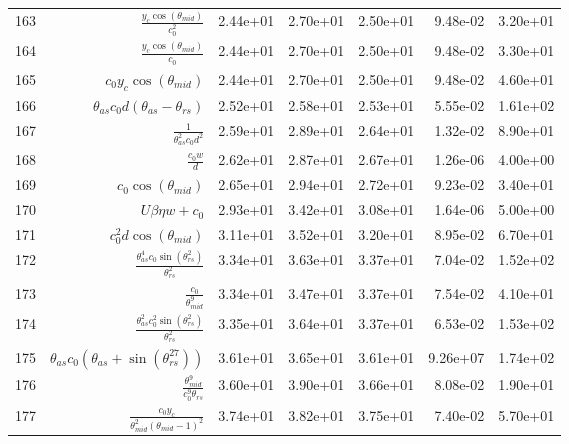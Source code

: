 \begin{tabularx}{\textwidth}{lRRRRRl}
163  &  $ \displaystyle\frac{y_c \cos{\left(\theta_{mid} \right)}}{c_{0}^{2}} $  &  2.44e+01  &  2.70e+01  &  2.50e+01  &  9.48e-02  &  3.20e+01  \\ 
164  &  $ \displaystyle\frac{y_c \cos{\left(\theta_{mid} \right)}}{c_{0}} $  &  2.44e+01  &  2.70e+01  &  2.50e+01  &  9.48e-02  &  3.30e+01  \\ 
165  &  $ c_{0} y_c \cos{\left(\theta_{mid} \right)} $  &  2.44e+01  &  2.70e+01  &  2.50e+01  &  9.48e-02  &  4.60e+01  \\ 
166  &  $ \theta_{as} c_{0} d \left(\theta_{as} - \theta_{rs}\right) $  &  2.52e+01  &  2.58e+01  &  2.53e+01  &  5.55e-02  &  1.61e+02  \\ 
167  &  $ \displaystyle\frac{1}{\theta_{as}^{2} c_{0} d^{2}} $  &  2.59e+01  &  2.89e+01  &  2.64e+01  &  1.32e-02  &  8.90e+01  \\ 
168  &  $ \displaystyle\frac{c_{0} w}{d} $  &  2.62e+01  &  2.87e+01  &  2.67e+01  &  1.26e-06  &  4.00e+00  \\ 
169  &  $ c_{0} \cos{\left(\theta_{mid} \right)} $  &  2.65e+01  &  2.94e+01  &  2.72e+01  &  9.23e-02  &  3.40e+01  \\ 
170  &  $ U \beta \eta w + c_{0} $  &  2.93e+01  &  3.42e+01  &  3.08e+01  &  1.64e-06  &  5.00e+00  \\ 
171  &  $ c_{0}^{2} d \cos{\left(\theta_{mid} \right)} $  &  3.11e+01  &  3.52e+01  &  3.20e+01  &  8.95e-02  &  6.70e+01  \\ 
172  &  $ \displaystyle\frac{\theta_{as}^{4} c_{0} \sin{\left(\theta_{rs}^{2} \right)}}{\theta_{rs}^{2}} $  &  3.34e+01  &  3.63e+01  &  3.37e+01  &  7.04e-02  &  1.52e+02  \\ 
173  &  $ \displaystyle\frac{c_{0}}{\theta_{mid}^{9}} $  &  3.34e+01  &  3.47e+01  &  3.37e+01  &  7.54e-02  &  4.10e+01  \\ 
174  &  $ \displaystyle\frac{\theta_{as}^{2} c_{0}^{2} \sin{\left(\theta_{rs}^{2} \right)}}{\theta_{rs}^{2}} $  &  3.35e+01  &  3.64e+01  &  3.37e+01  &  6.53e-02  &  1.53e+02  \\ 
175  &  $ \theta_{as} c_{0} \left(\theta_{as} + \sin{\left(\theta_{rs}^{27} \right)}\right) $  &  3.61e+01  &  3.65e+01  &  3.61e+01  &  9.26e+07  &  1.74e+02  \\ 
176  &  $ \displaystyle\frac{\theta_{mid}^{9}}{c_{0}^{9} \theta_{rs}} $  &  3.60e+01  &  3.90e+01  &  3.66e+01  &  8.08e-02  &  1.90e+01  \\ 
177  &  $ \displaystyle\frac{c_{0} y_c}{\theta_{mid}^{2} \left(\theta_{mid} - 1\right)^{2}} $  &  3.74e+01  &  3.82e+01  &  3.75e+01  &  7.40e-02  &  5.70e+01  \\ 

\end{tabularx}
